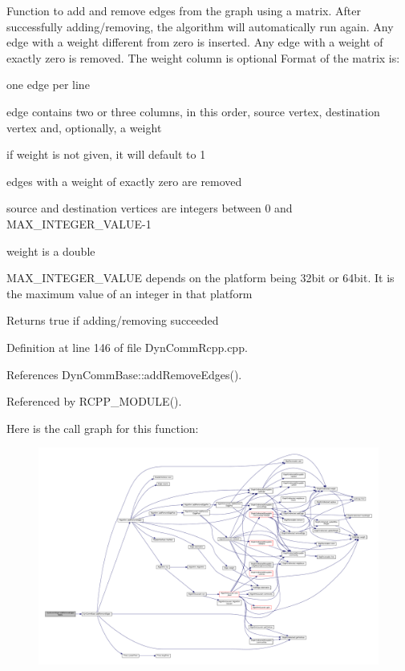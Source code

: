Function to add and remove edges from the graph using a matrix. After successfully adding/removing, the algorithm will automatically run again. Any edge with a weight different from zero is inserted. Any edge with a weight of exactly zero is removed. The weight column is optional Format of the matrix is\+:
\begin{DoxyItemize}
\item one edge per line
\item edge contains two or three columns, in this order, source vertex, destination vertex and, optionally, a weight
\item if weight is not given, it will default to 1
\item edges with a weight of exactly zero are removed
\item source and destination vertices are integers between 0 and M\+A\+X\+\_\+\+I\+N\+T\+E\+G\+E\+R\+\_\+\+V\+A\+L\+U\+E-\/1
\item weight is a double
\item M\+A\+X\+\_\+\+I\+N\+T\+E\+G\+E\+R\+\_\+\+V\+A\+L\+UE depends on the platform being 32bit or 64bit. It is the maximum value of an integer in that platform \begin{DoxyReturn}{Returns}
true if adding/removing succeeded 
\end{DoxyReturn}

\end{DoxyItemize}

Definition at line 146 of file Dyn\+Comm\+Rcpp.\+cpp.



References Dyn\+Comm\+Base\+::add\+Remove\+Edges().



Referenced by R\+C\+P\+P\+\_\+\+M\+O\+D\+U\+L\+E().

Here is the call graph for this function\+:
\nopagebreak
\begin{figure}[H]
\begin{center}
\leavevmode
\includegraphics[width=350pt]{classDynCommRcpp_ae9fb6b69740abb2d52721ec76d744811_cgraph}
\end{center}
\end{figure}
\mbox{\label{classDynCommRcpp_ade6d5c2ebbb13f2efb3988d0d0ac2c1e}} 
